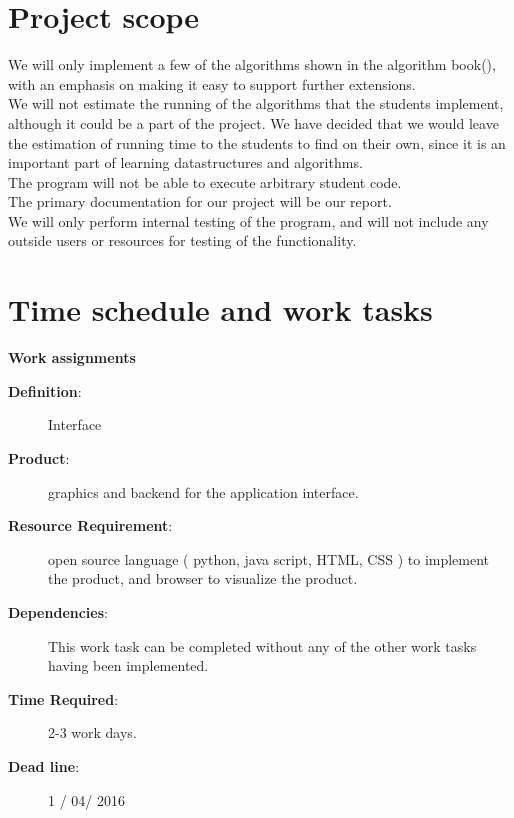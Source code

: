 \documentclass[11pt]{article}
\begin{document}
\section*{Project scope}
We will only implement a few of the algorithms shown in the algorithm book(\citep{algbog}), with an emphasis on making it easy to support further extensions.\\
We will not estimate the running of the algorithms that the students implement, although it could be a part of the project. We have decided that we would leave the estimation of running time to the students to find on their own, since it is an important part of learning datastructures and algorithms.\\
The program will not be able to execute arbitrary student code.\\
The primary documentation for our project will be our report.\\ 
We will only perform internal testing of the program, and will not include any outside users or resources for testing of the functionality.

\newpage
\section*{Time schedule and work tasks}
\noindent\makebox[\linewidth]{\rule{\paperwidth}{0.4pt}}
\begin{center}\textbf{Work assignments}\end{center}
\noindent\makebox[\linewidth]{\rule{\paperwidth}{0.4pt}}

\begin{description}
\item[\noindent\textbf{Definition}:] Interface\\
\item[\textbf{Product}:] graphics and backend for the application interface.\\
\item[\textbf{Resource Requirement}:] open source language ( python, java script, HTML, CSS ) to implement the product, and browser to visualize the product. \\
\item[\textbf{Dependencies}:] This work task can be completed without any of the other work tasks having been implemented.\\
\item[\textbf{Time Required}:] 2-3 work days.\\
\item[\textbf{Dead line}:] 1 / 04/ 2016\\
\end{description}
\noindent\makebox[\linewidth]{\rule{\paperwidth}{0.4pt}}
\end{document}

